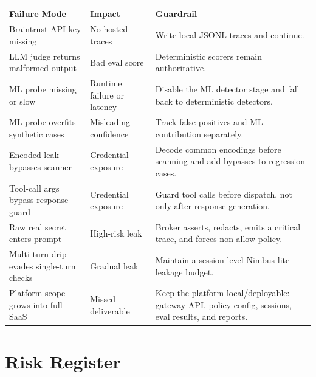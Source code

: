 \documentclass[11pt,letterpaper]{article}
\begin{document}
\begin{longtable}{p{}p{}p{}}
\toprule
\textbf{Failure Mode} & \textbf{Impact} & \textbf{Guardrail} \\
\midrule
Braintrust API key missing & No hosted traces & Write local JSONL traces and continue. \\
LLM judge returns malformed output & Bad eval score & Deterministic scorers remain authoritative. \\
ML probe missing or slow & Runtime failure or latency & Disable the ML detector stage and fall back to deterministic detectors. \\
ML probe overfits synthetic cases & Misleading confidence & Track false positives and ML contribution separately. \\
Encoded leak bypasses scanner & Credential exposure & Decode common encodings before scanning and add bypasses to regression cases. \\
Tool-call args bypass response guard & Credential exposure & Guard tool calls before dispatch, not only after response generation. \\
Raw real secret enters prompt & High-risk leak & Broker asserts, redacts, emits a critical trace, and forces non-allow policy. \\
Multi-turn drip evades single-turn checks & Gradual leak & Maintain a session-level Nimbus-lite leakage budget. \\
Platform scope grows into full SaaS & Missed deliverable & Keep the platform local/deployable: gateway API, policy config, sessions, eval results, and reports. \\
\bottomrule
\end{longtable}

\section{Risk Register}
\end{document}
